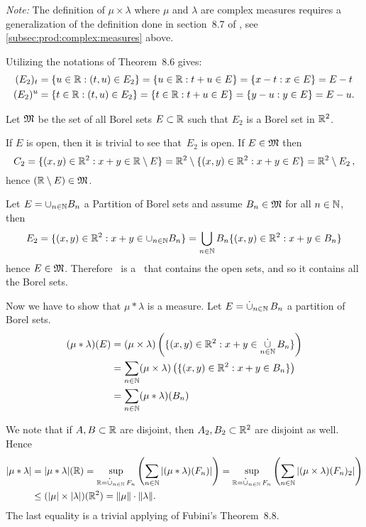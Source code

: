\begin{enumerate}
\emph{Note:} The definition of \(\mu\times\lambda\) where 
\(\mu\) and \(\lambda\) are complex measures requires a generalization
of the definition done in section~8.7 of \cite{RudinRCA87},
see \ref{subsec:prod:complex:measures} above.

Utilizing the notations of Theorem~8.6 gives:
\begin{align*}
(E_2)_t &= \{u\in\mathbb{R}: (t,u)\in E_2\} = \{u\in\mathbb{R}: t+u\in E\} 
    = \{x-t: x\in E\} = E-t \\
(E_2)^u &= \{t\in\mathbb{R}: (t,u)\in E_2\} = \{t\in\mathbb{R}: t+u\in E\} 
    = \{y-u: y\in E\} = E-u.
\end{align*}

\begin{itemize}
Let \(\mathfrak{M}\) be the set of all Borel sets \(E\subset \mathbb{R}\)
such that \(E_2\) is a Borel set in \(\mathbb{R}^2\).


If $E$ is open, then it is trivial to see that~\(E_2\) is open. 
If \(E\in\mathfrak{M}\) then 
\begin{equation*}
C_2 
= \{(x,y)\in\mathbb{R}^2: x+y \in \mathbb{R}\setminus E\}
= \mathbb{R}^2 \setminus \{(x,y)\in\mathbb{R}^2: x+y \in E\}
= \mathbb{R}^2 \setminus E_2\,,
\end{equation*}
hence \((\mathbb{R}\setminus E)\in\mathfrak{M}\).

Let \(E = \cup_{n\in\mathbb{N}}B_n\) a Partition of Borel sets
and assume \(B_n\in\mathfrak{M}\) for all \(n\in\mathbb{N}\), then
\begin{equation*}
E_2 
= \{(x,y)\in\mathbb{R}^2: x+y \in \cup_{n\in\mathbb{N}}B_n\}
= \bigcup_{n\in\mathbb{N}}B_n \{(x,y)\in\mathbb{R}^2: x+y \in B_n\}
\end{equation*}
hence \(E\in\mathfrak{M}\).
Therefore \frakM\ is a \salgebra\ that contains the open sets,
and so it contains all the Borel sets.


Now we have to show that \(\mu\ast\lambda\) is a measure.
Let \(E=\disjunion_{n\in\N} B_n\) a partition of Borel sets.
\begin{align*}
(\mu\ast\lambda)(E)
&= (\mu\times\lambda)\left(\{(x,y)\in\R^2: x+y\in\disjunion_{n\in\N} B_n\}\right)
  \\
&= \sum_{n\in\N}(\mu\times\lambda)\left(\{(x,y)\in\R^2: x+y \in B_n\}\right) \\
&= \sum_{n\in\N}(\mu\ast\lambda)(B_n)
\end{align*}

We note that if \(A,B\subset\mathbb{R}\) are disjoint, then
\(A_2,B_2\subset\mathbb{R}^2\) are disjoint as well. Hence
\begin{align*}
\left|\mu\ast\lambda\right|
&= |\mu\ast\lambda|(\R)
 = \sup_{\R=\disjunion_{n\in\N} F_n} 
   \left(\sum_{n\in\N} \left| (\mu\ast\lambda) (F_n)\right|\right)
 = \sup_{\R=\disjunion_{n\in\N} F_n} 
   \left(\sum_{n\in\N} \left| (\mu\times\lambda) (F_n)_2\right|\right)
   \\
&\leq (|\mu|\times|\lambda|)(\R^2) 
 = \|\mu\|\cdot\|\lambda\|.
\end{align*}
The last equality is a trivial applying of 
Fubini's Theorem~8.8.


\end{itemize}
\end{enumerate}

